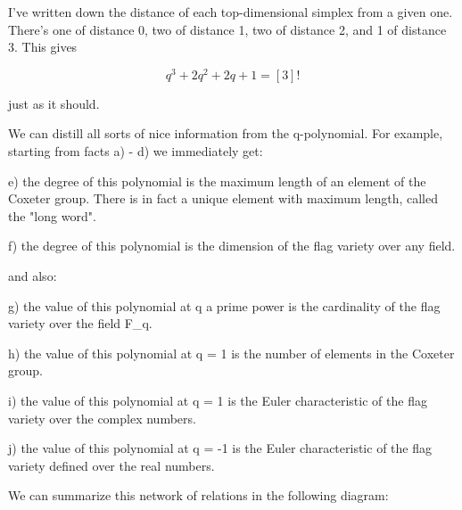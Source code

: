 I've written down the distance of each top-dimensional simplex
from a given one.  There's one of distance 0, two of distance 1,
two of distance 2, and 1 of distance 3.  This gives

$$
q^{3} + 2q^{2} + 2q + 1 =  [3]!
$$
    
just as it should.

We can distill all sorts of nice information from the q-polynomial.
For example, starting from facts a) - d) we immediately get:

e) the degree of this polynomial is the maximum length of an element
of the Coxeter group.  There is in fact a unique element with maximum
length, called the "long word".

f) the degree of this polynomial is the dimension of the flag variety
over any field. 

and also:

g) the value of this polynomial at q a prime power is the cardinality
of the flag variety over the field F_{q}.

h) the value of this polynomial at q = 1 is the number of elements
in the Coxeter group.

i) the value of this polynomial at q = 1 is the Euler characteristic
of the flag variety over the complex numbers.

j) the value of this polynomial at q = -1 is the Euler characteristic
of the flag variety defined over the real numbers.

We can summarize this network of relations in the following diagram:


